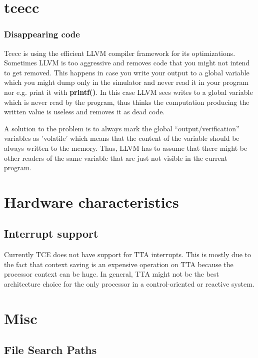 \documentclass[twoside]{tceusermanual}
\begin{document}
\section{tcecc}

\subsubsection{Disappearing code}

Tcecc is using the efficient LLVM compiler framework for its optimizations.
Sometimes LLVM is too aggressive and removes code that you might not
intend to get removed. This happens in case you write your output to a
global variable which you might dump only in the simulator and never read 
it in your program nor e.g. print it with \textbf{printf()}. In this case 
LLVM sees writes to a global variable which is never read by the program, 
thus thinks the computation producing the written value is useless and 
removes it as dead code.

A solution to the problem is to always mark the global ``output/verification'' 
variables as 'volatile' which means that the content of the variable should 
be always written to the memory. Thus, LLVM has to assume that there might 
be other readers of the same variable that are just not visible in the 
current program.

\section{Hardware characteristics}

\subsection{Interrupt support}

Currently TCE does not have support for TTA interrupts. This is mostly due to
the fact that context saving is an expensive operation on TTA because the
processor context can be huge. In general, TTA might not be the best
architecture choice for the only processor in a control-oriented or reactive 
system.

\section{Misc}

\subsection{File Search Paths}
\end{document}
